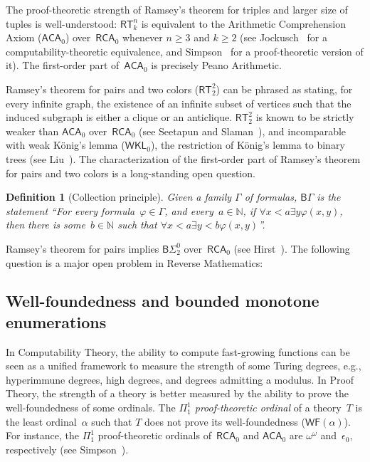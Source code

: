 \documentclass{article}
\numberwithin{theorem}{section}
\newtheorem{question}[theorem]{Question}
\newtheorem{definition}[theorem]{Definition}
\newcommand{\RCA}{\mathsf{RCA}}
\newcommand{\WKL}{\mathsf{WKL}}
\newcommand{\ACA}{\mathsf{ACA}}
\newcommand{\BSig}{\mathsf{B}\Sigma^0}
\newcommand{\WF}{\mathsf{WF}}
\newcommand{\RT}{\mathsf{RT}}
\newcommand{\NN}{\mathbb{N}}
\def\qt#1{``#1''}%
\begin{document}
The proof-theoretic strength of Ramsey's theorem for triples and larger size of tuples is well-understood: $\RT^n_k$ is equivalent to the Arithmetic Comprehension Axiom ($\ACA_0$) over~$\RCA_0$ whenever $n \geq 3$ and $k \geq 2$ (see Jockusch~\cite{jockusch1972ramsey} for a computability-theoretic equivalence, and Simpson~\cite[Theorem III.7.6]{simpson_2009} for a proof-theoretic version of it). The first-order part of~$\ACA_0$ is precisely Peano Arithmetic.


Ramsey's theorem for pairs and two colors ($\RT^2_2$) can be phrased as stating, for every infinite graph, the existence of an infinite subset of vertices such that the induced subgraph is either a clique or an anticlique. $\RT^2_2$ is known to be strictly weaker than $\ACA_0$ over~$\RCA_0$ (see Seetapun and Slaman~\cite{seetapun1995strength}), and incomparable with weak K\"onig's lemma ($\WKL_0$), the restriction of K\"onig's lemma to binary trees (see Liu~\cite{liu2012rt22}).
The characterization of the first-order part of Ramsey's theorem for pairs and two colors is a long-standing open question.

\begin{definition}[Collection principle]
Given a family $\Gamma$ of formulas, $\mathsf{B}\Gamma$ is the statement \qt{For every formula~$\varphi \in \Gamma$, and every~$a \in \NN$, if $\forall x < a \exists y \varphi(x, y)$, then there is some~$b \in \NN$ such that $\forall x < a \exists y < b \varphi(x, y)$}.
\end{definition}

Ramsey's theorem for pairs implies $\BSig_2$ over~$\RCA_0$ (see Hirst~\cite{hirst1987combinatorics}). The following question is a major open problem in Reverse Mathematics:  


\subsection{Well-foundedness and bounded monotone enumerations}

In Computability Theory, the ability to compute fast-growing functions can be seen as a unified framework to measure the strength of some Turing degrees, e.g., hyperimmune degrees, high degrees, and degrees admitting a modulus. In Proof Theory, the strength of a theory is better measured by the ability to prove the well-foundedness of some ordinals. The \emph{$\Pi^1_1$ proof-theoretic ordinal} of a theory~$T$ is the least ordinal~$\alpha$ such that $T$ does not prove its well-foundedness ($\WF(\alpha)$). For instance, the $\Pi^1_1$ proof-theoretic ordinals of~$\RCA_0$ and $\ACA_0$ are $\omega^\omega$ and~$\epsilon_0$, respectively (see Simpson~\cite{simpson_2009}). 
\end{document}
